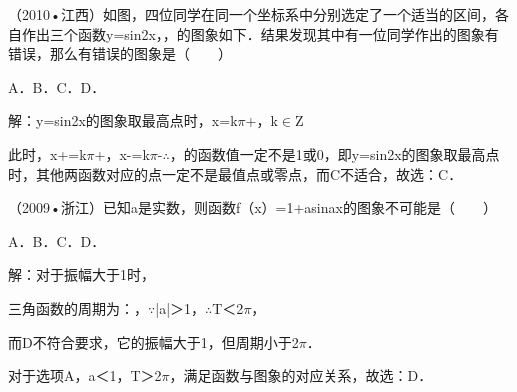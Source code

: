 \begin{question}
（2010•江西）如图，四位同学在同一个坐标系中分别选定了一个适当的区间，各自作出三个函数y=sin2x，，的图象如下．结果发现其中有一位同学作出的图象有错误，那么有错误的图象是（　　）\par
A．\qquad{}B．\qquad{}C．\qquad{}D．\par
\begin{solution}
解：y=sin2x的图象取最高点时，x=k\ensuremath{\pi}+，k\ensuremath{\in}Z\par
此时，x+=k\ensuremath{\pi}+，x-=k\ensuremath{\pi}-\ensuremath{\therefore}，的函数值一定不是1或0，即y=sin2x的图象取最高点时，其他两函数对应的点一定不是最值点或零点，而C不适合，故选：C．\par
\end{solution}
\end{question}

\begin{question}
（2009•浙江）已知a是实数，则函数f（x）=1+asinax的图象不可能是（　　）\par
A．\qquad{}B．\qquad{}C．\qquad{}D．\par
\begin{solution}
解：对于振幅大于1时，\par
三角函数的周期为：，\ensuremath{\because}|a|＞1，\ensuremath{\therefore}T＜2\ensuremath{\pi}，\par
而D不符合要求，它的振幅大于1，但周期小于2\ensuremath{\pi}．\par
对于选项A，a＜1，T＞2\ensuremath{\pi}，满足函数与图象的对应关系，故选：D．\par
\end{solution}
\end{question}


